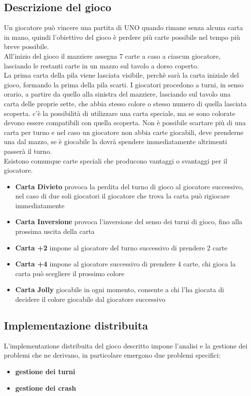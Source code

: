 \documentclass[10pt,a4paper]{article}
\begin{document}
\subsection{Descrizione del gioco}
Un giocatore può vincere una partita di UNO quando rimane senza alcuna carta in mano, quindi l'obiettivo del gioco è perdere più carte possibile nel tempo più breve possibile.\\All'inizio del gioco il mazziere assegna 7 carte a caso a ciascun giocatore, lasciando le restanti carte in un mazzo sul tavolo a dorso coperto.\\ La prima carta della pila viene lasciata visibile, perchè sarà la carta iniziale del gioco, formando la prima della pila scarti. I giocatori procedono a turni, in senso orario, a partire da quello alla sinistra del mazziere, lasciando sul tavolo una carta delle proprie sette, che abbia stesso colore o stesso numero di quella lasciata scoperta. c'è la possibilità di utilizzare una carta speciale, ma se sono colorate devono essere compatibili con quella scoperta. Non è possibile scartare più di una carta per turno e nel caso un giocatore non abbia carte giocabili, deve prenderne una dal mazzo, se è giocabile la dovrà spendere immediatamente altrimenti passerà il turno.\\ Esistono comunque carte speciali che producono vantaggi o svantaggi per il giocatore.\\

\begin{itemize}
\item \textbf{Carta Divieto} provoca la perdita del turno di gioco al giocatore successivo, nel caso di due soli giocatori il giocatore che trova la carta può rigiocare immediatamente
\item \textbf{Carta Inversione} provoca l'inversione del senso dei turni di gioco, fino alla prossima uscita della carta
\item \textbf{Carta +2} impone al giocatore del turno successivo di prendere 2 carte
\item \textbf{Carta +4} impone al giocatore successivo di prendere 4 carte, chi gioca la carta può scegliere il prossimo colore
\item \textbf{Carta Jolly} giocabile in ogni momento, consente a chi l'ha giocata di decidere il colore giocabile dal giocatore successivo
\end{itemize}

\subsection{Implementazione distribuita}
L'implementazione distribuita del gioco descritto impone l'analisi e la gestione dei problemi che ne derivano, in particolare emergono due problemi specifici:
\begin{itemize}
\item \textbf{gestione dei turni}
\item \textbf{gestione dei crash}
\end{itemize}
\end{document}
